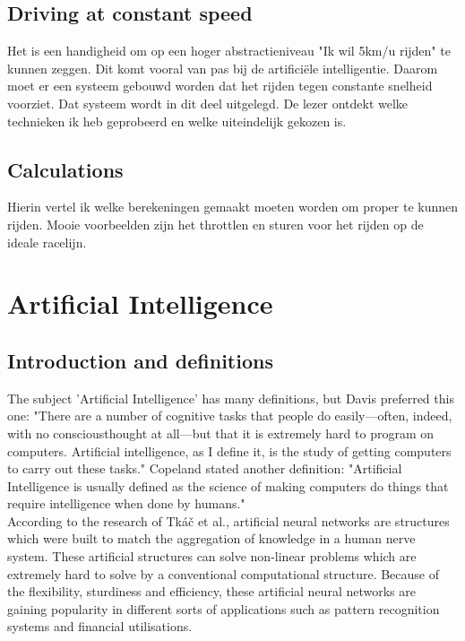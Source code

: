 \documentclass[conference,a4paper]{IEEEtran}
\begin{document}
\subsection{Driving at constant speed}
Het is een handigheid om op een hoger abstractieniveau "Ik wil 5km/u rijden" te kunnen zeggen. Dit komt vooral van pas bij de artificiële intelligentie. Daarom moet er een systeem gebouwd worden dat het rijden tegen constante snelheid voorziet. Dat systeem wordt in dit deel uitgelegd. De lezer ontdekt welke technieken ik heb geprobeerd en welke uiteindelijk gekozen is.

\subsection{Calculations}
Hierin vertel ik welke berekeningen gemaakt moeten worden om proper te kunnen rijden. Mooie voorbeelden zijn het throttlen en sturen voor het rijden op de ideale racelijn.

\section{Artificial Intelligence}
\subsection{Introduction and definitions}
The subject 'Artificial Intelligence' has many definitions, but Davis preferred this one: "There are a number of cognitive tasks that people do easily---often, indeed, with no consciousthought at all---but that it is extremely hard to program on computers. Artificial intelligence, as I define it, is the study of getting computers to carry out these tasks."\cite{Davis2014} Copeland stated another definition: "Artificial Intelligence is usually defined as the science of making computers do things that require intelligence when done by humans." \cite{Cop2000}\\

According to the research of Tk{\'{a}}{\v{c}} et al.\cite{Tkac2015}, artificial neural networks are structures which were built to match the aggregation of knowledge in a human nerve system. These artificial structures can solve non-linear problems which are extremely hard to solve by a conventional computational structure. Because of the flexibility, sturdiness and efficiency, these artificial neural networks are gaining popularity in different sorts of applications such as pattern recognition systems and financial utilisations.\cite{yegnanarayana2009artificial,Tkac2015}\\
\end{document}
